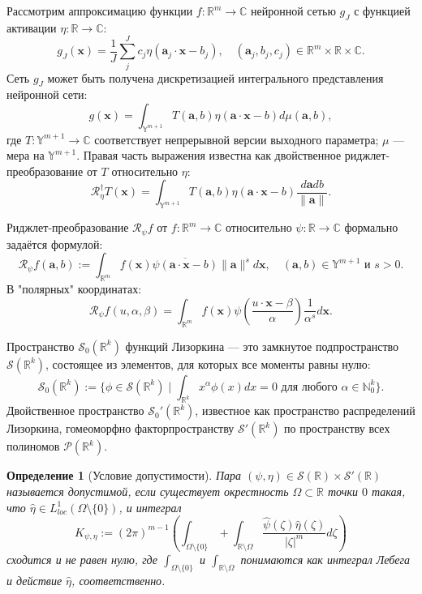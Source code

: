 \documentclass[12pt]{article}
\newtheorem{definition}{Определение}
\begin{document}
Рассмотрим аппроксимацию функции \( f : \mathbb{R}^m \to \mathbb{C} \) нейронной сетью \( g_J \) с функцией активации \( \eta : \mathbb{R} \to \mathbb{C} \):
\[
g_J(\mathbf{x}) = \frac{1}{J} \sum_{j}^{J} c_j \eta (\mathbf{a}_j \cdot \mathbf{x} - b_j), \quad (\mathbf{a}_j, b_j, c_j) \in \mathbb{R}^m \times \mathbb{R} \times \mathbb{C}.
\]
Сеть \( g_J \) может быть получена дискретизацией интегрального представления нейронной сети:
\[
g(\mathbf{x}) = \int_{\mathbb{Y}^{m+1}} T(\mathbf{a}, b)\eta(\mathbf{a} \cdot \mathbf{x} - b)d\mu(\mathbf{a}, b),
\]
где \( T : \mathbb{Y}^{m+1} \rightarrow \mathbb{C} \) соответствует непрерывной версии выходного параметра; \( \mu \) — мера на \( \mathbb{Y}^{m+1} \). Правая часть выражения известна как двойственное риджлет-преобразование от \( T \) относительно \( \eta \):
\[
\mathscr{R}_\eta^\dagger T(\mathbf{x}) = \int_{\mathbb{Y}^{m+1}} T(\mathbf{a}, b)\eta(\mathbf{a} \cdot \mathbf{x} - b)\frac{d\mathbf{a}db}{\|\mathbf{a}\|}.
\]

Риджлет-преобразование \( \mathscr{R}_\psi f \) от \( f : \mathbb{R}^m \to \mathbb{C} \) относительно \( \psi : \mathbb{R} \to \mathbb{C} \) формально задаётся формулой:
\[
\mathscr{R}_\psi f(\mathbf{a}, b) := \int_{\mathbb{R}^m} f(\mathbf{x}) \overline{\psi(\mathbf{a} \cdot \mathbf{x} - b)} \|\mathbf{a}\|^{s} d\mathbf{x}, \quad (\mathbf{a}, b) \in \mathbb{Y}^{m+1} \text{ и } s > 0.
\]
В "полярных" координатах:
\[
\mathscr{R}_\psi f(u, \alpha, \beta) = \int_{\mathbb{R}^m} f(\mathbf{x}) \psi \left( \frac{u \cdot \mathbf{x} - \beta}{\alpha} \right) \frac{1}{\alpha^s} d\mathbf{x}.
\]

Пространство \( \mathcal{S}_0(\mathbb{R}^k) \) функций Лизоркина — это замкнутое подпространство \( \mathcal{S}(\mathbb{R}^k) \), состоящее из элементов, для которых все моменты равны нулю:
\[
\mathcal{S}_0(\mathbb{R}^k) := \{\phi \in \mathcal{S}(\mathbb{R}^k) \mid \int_{\mathbb{R}^k} x^{\alpha} \phi(x) dx = 0 \text{ для любого } \alpha \in \mathbb{N}_0^k\}.
\]
Двойственное пространство \( \mathcal{S}_0'(\mathbb{R}^k) \), известное как пространство распределений Лизоркина, гомеоморфно факторпространству \( \mathcal{S}'(\mathbb{R}^k) \) по пространству всех полиномов \( \mathcal{P}(\mathbb{R}^k) \).

\begin{definition}[Условие допустимости]
	Пара \( (\psi, \eta) \in \mathcal{S}(\mathbb{R}) \times \mathcal{S}'(\mathbb{R}) \) называется допустимой, если существует окрестность \( \Omega \subset \mathbb{R} \) точки \( 0 \) такая, что \( \hat{\eta} \in L_{loc}^{1}(\Omega \setminus \{0\}) \), и интеграл
	\[
	K_{\psi, \eta} := (2\pi)^{m-1} \left( \int_{\Omega \setminus \{0\}} + \int_{\mathbb{R} \setminus \Omega} \frac{\hat{\psi}(\zeta)\hat{\eta}(\zeta)}{|\zeta|^m} d\zeta \right)
	\]
	сходится и не равен нулю, где \( \int_{\Omega \setminus \{0\}} \) и \( \int_{\mathbb{R} \setminus \Omega} \) понимаются как интеграл Лебега и действие \( \hat{\eta} \), соответственно.
\end{definition}
\end{document}

